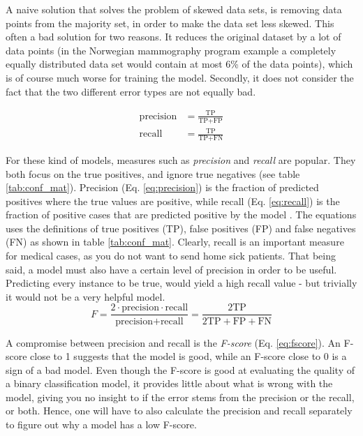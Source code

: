A naive solution that solves the problem of skewed data sets, is removing data points from the majority set, in order to make the data set less skewed.
This often a bad solution for two reasons.
It reduces the original dataset by a lot of data points (in the Norwegian mammography program example a completely equally distributed data set would contain at most 6\% of the data points), which is of course much worse for training the model.
Secondly, it does not consider the fact that the two different error types are not equally bad.

\begin{align}
    \label{eq:precision} \text{precision} &= \frac{\text{TP}}{\text{TP}+\text{FP}} \\
    \label{eq:recall} \text{recall} &= \frac{\text{TP}}{\text{TP}+\text{FN}}
\end{align}

For these kind of models, measures such as \textit{precision} and \textit{recall} are popular.
They both focus on the true positives, and ignore true negatives (see table \ref{tab:conf_mat}).
Precision (Eq. \ref{eq:precision}) is the fraction of predicted positives where the true values are positive, while recall (Eq. \ref{eq:recall}) is the fraction of positive cases that are predicted positive by the model \citep[p. 418]{Goodfellow-et-al-2016}.
The equations uses the definitions of true positives (TP), false positives (FP) and false negatives (FN) as shown in table \ref{tab:conf_mat}.
Clearly, recall is an important measure for medical cases, as you do not want to send home sick patients.
That being said, a model must also have a certain level of precision in order to be useful. Predicting every instance to be true, would yield a high recall value - but trivially it would not be a very helpful model.
\begin{equation}\label{eq:fscore}
    F = \frac{2\cdot \text{precision} \cdot \text{recall}}{\text{precision} + \text{recall}}
    = \frac{2 \text{TP}}{2 \text{TP}+\text{FP}+\text{FN}}
\end{equation}

A compromise between precision and recall is the \textit{F-score} (Eq. \ref{eq:fscore}).
An F-score close to 1 suggests that the model is good, while an F-score close to 0 is a sign of a bad model.
Even though the F-score is good at evaluating the quality of a binary classification model, it provides little about what is wrong with the model, giving you no insight to if the error stems from the precision or the recall, or both.
Hence, one will have to also calculate the precision and recall separately to figure out why a model has a low F-score.

